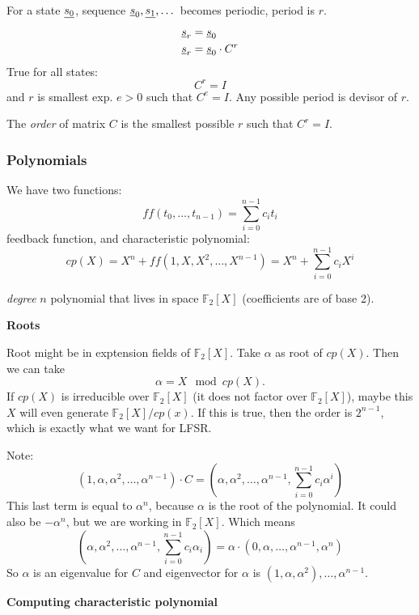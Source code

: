 \documentclass[language=english,number=]{homework}
\begin{document}
For a state $\underline{s_0}$, sequence $\underline{s}_{0}, \underline{s_1}, \dots$ becomes periodic, period is $r$.
\begin{align*}
\underline{s}_r &= \underline{s}_0 \\
\underline{s}_r &= \underline{s}_0 \cdot C^r \\
\end{align*}
True for all states:
\[
C^r = I
\]
and $r$ is smallest exp. $e > 0$ such that $C^e = I$.
Any possible period is devisor of $r$.

\begin{definition}
The \emph{order} of matrix $C$ is the smallest possible $r$ such that $C^r = I$.
\end{definition}

\subsubsection{Polynomials}

We have two functions:
\[
ff(t_0, \dots, t_{n-1}) = \sum_{i = 0}^{n-1} c_i t_i
\]
feedback function, and characteristic polynomial:
\[
cp(X) = X^n + ff(1, X, X^2, \dots, X^{n-1}) = X^n + \sum_{i = 0}^{n-1} c_i X^i
\]

\emph{degree} $n$ polynomial that lives in space $\mathbb{F}_2[X]$ (coefficients are of base 2).

\textbf*{Roots}

Root might be in exptension fields of $\mathbb{F}_2[X]$.
Take $\alpha$ as root of $cp(X)$.
Then we can take
\[
\alpha = X \mod cp(X).
\]
If $cp(X)$ is irreducible over $\mathbb{F}_2[X]$ (it does not factor over $\mathbb{F}_2[X]$), maybe this $X$ will even generate $\mathbb{F}_2[X] / cp(x)$.
If this is true, then the order is $2^{n-1}$, which is exactly what we want for LFSR.

Note:
\[
(1, \alpha, \alpha^2, \dots, \alpha^{n-1}) \cdot C = \left(\alpha, \alpha^2, \dots, \alpha^{n-1},  \sum_{i=0}^{n-1} c_i \alpha^i \right)
\]
This last term is equal to $\alpha^n$, because $\alpha$ is the root of the polynomial.
It could also be $- \alpha^n$, but we are working in $\mathbb{F}_2[X]$.
Which means
\[
\left(\alpha, \alpha^2, \dots, \alpha^{n-1}, \sum_{i=0}^{n-1}  c_i \alpha_i \right) = \alpha \cdot (0, \alpha, \dots, \alpha^{n-1}, \alpha^n)
\]
So $\alpha$ is an eigenvalue for $C$ and eigenvector for $\alpha$ is $(1, \alpha, \alpha^2), \dots, \alpha^{n-1}$.

\textbf*{Computing characteristic polynomial}
\end{document}

